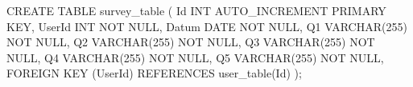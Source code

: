 CREATE TABLE survey_table (
    Id INT AUTO_INCREMENT PRIMARY KEY,
    UserId INT NOT NULL,
    Datum DATE NOT NULL,
    Q1 VARCHAR(255) NOT NULL,
    Q2 VARCHAR(255) NOT NULL,
    Q3 VARCHAR(255) NOT NULL,
    Q4 VARCHAR(255) NOT NULL,
    Q5 VARCHAR(255) NOT NULL,
    FOREIGN KEY (UserId) REFERENCES user_table(Id)
);